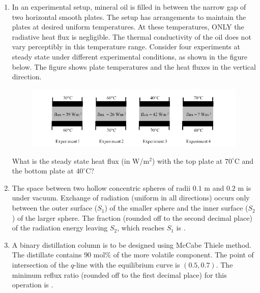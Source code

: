 \documentclass[journal,12pt,onecolumn]{IEEEtran}
\theoremstyle{remark}
\begin{document}
\begin{enumerate}
\item In an experimental setup, mineral oil is filled in between the narrow gap of two horizontal smooth plates. The setup has arrangements to maintain the plates at desired uniform temperatures. At these temperatures, ONLY the radiative heat flux is negligible. The thermal conductivity of the oil does not vary perceptibly in this temperature range. Consider four experiments at steady state under different experimental conditions, as shown in the figure below. The figure shows plate temperatures and the heat fluxes in the vertical direction.
\begin{figure}[H]
    \centering
    \includegraphics[width=0.5\columnwidth]{figs/qn 41.jpg}
    \caption{}
    \label{fig:qn 51.jpg}
\end{figure}
What is the steady state heat flux (in W/m$^2$) with the top plate at $70^\circ$C and the bottom plate at $40^\circ$C?
\hfill{}
\begin{enumerate}
\end{enumerate}

\item The space between two hollow concentric spheres of radii $0.1$ m and $0.2$ m is under vacuum. Exchange of radiation (uniform in all directions) occurs only between the outer surface ($S_1$) of the smaller sphere and the inner surface ($S_2$) of the larger sphere. The fraction (rounded off to the second decimal place) of the radiation energy leaving $S_2$, which reaches $S_1$ is \underline{\hspace{1cm}}.\hfill{}

\item A binary distillation column is to be designed using McCabe Thiele method. The distillate contains $90$ mol\% of the more volatile component. The point of intersection of the $q$-line with the equilibrium curve is $(0.5, 0.7)$. The minimum reflux ratio (rounded off to the first decimal place) for this operation is \underline{\hspace{1cm}}.\hfill{}


\end{enumerate}
\end{document}

